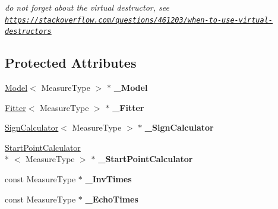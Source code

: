 \begin{DoxyCompactItemize}
\begin{DoxyCompactList}\small\item\em do not forget about the virtual destructor, see \href{https://stackoverflow.com/questions/461203/when-to-use-virtual-destructors}{\tt https\-://stackoverflow.\-com/questions/461203/when-\/to-\/use-\/virtual-\/destructors} \end{DoxyCompactList}\end{DoxyCompactItemize}
\subsection*{Protected Attributes}
\begin{DoxyCompactItemize}
\item 
\hypertarget{class_ox_1_1_calculator_a37dee4f1bb2fcae66c6710a642fe6d7b}{\hyperlink{class_ox_1_1_model}{Model}$<$ Measure\-Type $>$ $\ast$ {\bfseries \-\_\-\-Model}}\label{class_ox_1_1_calculator_a37dee4f1bb2fcae66c6710a642fe6d7b}

\item 
\hypertarget{class_ox_1_1_calculator_ae00ef8e7db2e9eaa86b8649815246bf9}{\hyperlink{class_ox_1_1_fitter}{Fitter}$<$ Measure\-Type $>$ $\ast$ {\bfseries \-\_\-\-Fitter}}\label{class_ox_1_1_calculator_ae00ef8e7db2e9eaa86b8649815246bf9}

\item 
\hypertarget{class_ox_1_1_calculator_a0655f664d37e70e589bb8526175f19bb}{\hyperlink{class_ox_1_1_sign_calculator}{Sign\-Calculator}$<$ Measure\-Type $>$ $\ast$ {\bfseries \-\_\-\-Sign\-Calculator}}\label{class_ox_1_1_calculator_a0655f664d37e70e589bb8526175f19bb}

\item 
\hypertarget{class_ox_1_1_calculator_a8873b376837e41f40e2a9286a9ea5896}{\hyperlink{class_ox_1_1_start_point_calculator}{Start\-Point\-Calculator}\\*
$<$ Measure\-Type $>$ $\ast$ {\bfseries \-\_\-\-Start\-Point\-Calculator}}\label{class_ox_1_1_calculator_a8873b376837e41f40e2a9286a9ea5896}

\item 
\hypertarget{class_ox_1_1_calculator_ab5f694e40a431677359b6933154eebc0}{const Measure\-Type $\ast$ {\bfseries \-\_\-\-Inv\-Times}}\label{class_ox_1_1_calculator_ab5f694e40a431677359b6933154eebc0}

\item 
\hypertarget{class_ox_1_1_calculator_acc5f2033f9e72e394abae75abdb70076}{const Measure\-Type $\ast$ {\bfseries \-\_\-\-Echo\-Times}}\label{class_ox_1_1_calculator_acc5f2033f9e72e394abae75abdb70076}


\end{DoxyCompactItemize}
